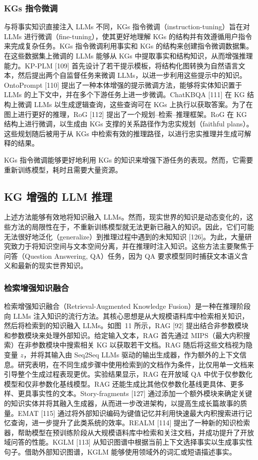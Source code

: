 \documentclass[11pt,UTF8,fontset=fandol]{ctexart}
\begin{document}
\subsubsection{KGs 指令微调}

与将事实知识直接注入 LLMs 不同，KGs 指令微调（instruction-tuning）旨在对 LLMs 进行微调（fine-tuning），使其更好地理解 KGs 的结构并有效遵循用户指令来完成复杂任务。KGs 指令微调利用事实和 KGs 的结构来创建指令微调数据集。在这些数据集上微调的 LLMs 能够从 KGs 中提取事实和结构知识，从而增强推理能力。KP-PLM [109] 首先设计了若干提示模板，将结构化图转换为自然语言文本，然后提出两个自监督任务来微调 LLMs，以进一步利用这些提示中的知识。OntoPrompt [110] 提出了一种本体增强的提示微调方法，能够将实体知识置于 LLMs 的上下文中，并在多个下游任务上进一步微调。ChatKBQA [111] 在 KG 结构上微调 LLMs 以生成逻辑查询，这些查询可在 KGs 上执行以获取答案。为了在图上进行更好的推理，RoG [112] 提出了一个规划--检索--推理框架。RoG 在 KG 结构上进行微调，以生成由 KGs 支撑的关系路径作为忠实规划（faithful plans）。这些规划随后被用于从 KGs 中检索有效的推理路径，以进行忠实推理并生成可解释的结果。

KGs 指令微调能够更好地利用 KGs 的知识来增强下游任务的表现。然而，它需要重新训练模型，耗时且需要大量资源。

\subsection{KG 增强的 LLM 推理}

上述方法能够有效地将知识融入 LLMs。然而，现实世界的知识是动态变化的，这些方法的局限性在于，不重新训练模型就无法更新已融入的知识。因此，它们可能无法很好地泛化（generalize）到推理过程中遇到的未知知识 [126]。为此，大量研究致力于将知识空间与文本空间分离，并在推理时注入知识。这些方法主要聚焦于问答（Question Answering, QA）任务，因为 QA 要求模型同时捕获文本语义含义和最新的现实世界知识。

\subsubsection{检索增强知识融合}

检索增强知识融合（Retrieval-Augmented Knowledge Fusion）是一种在推理阶段向 LLMs 注入知识的流行方法。其核心思想是从大规模语料库中检索相关知识，然后将检索到的知识融入 LLMs。如图~11 所示，RAG [92] 提出结合非参数模块和参数模块来处理外部知识。给定输入文本，RAG 首先通过 MIPS（最大内积搜索）在非参数模块中搜索相关 KG 以获取若干文档。RAG 随后将这些文档视为隐变量 $z$，并将其输入由 Seq2Seq LLMs 驱动的输出生成器，作为额外的上下文信息。研究表明，在不同生成步骤中使用检索到的文档作为条件，比仅用单一文档来引导整个生成过程表现更优。实验结果显示，RAG 在开放域 QA 中优于仅参数化模型和仅非参数化基线模型。RAG 还能生成比其他仅参数化基线更具体、更多样、更具事实性的文本。Story-fragments [127] 通过添加一个额外模块来确定关键的知识实体并将其融入生成器，从而进一步改进架构，以提高生成长篇故事的质量。EMAT [115] 通过将外部知识编码为键值记忆并利用快速最大内积搜索进行记忆查询，进一步提升了此类系统的效率。REALM [114] 提出了一种新的知识检索器，帮助模型在预训练阶段从大规模语料库中检索和关注文档，并成功提升了开放域问答的性能。KGLM [113] 从知识图谱中根据当前上下文选择事实以生成事实性句子。借助外部知识图谱，KGLM 能够使用领域外的词汇或短语描述事实。
\end{document}

